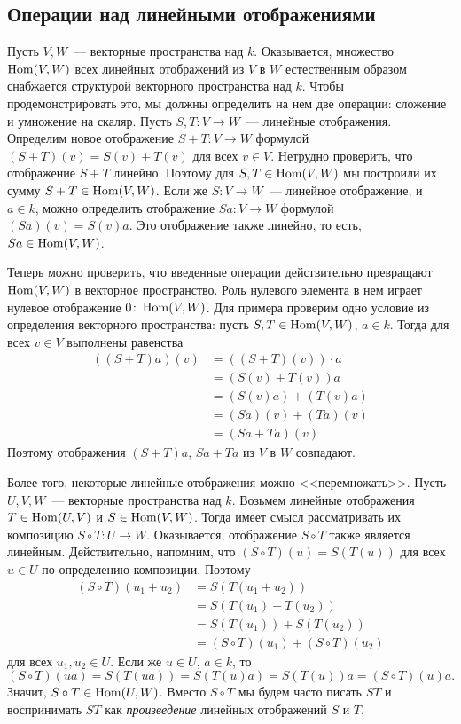 \subsection{Операции над линейными отображениями}\label{subsect:hom_space}



Пусть $V,W$~--- векторные пространства над $k$. Оказывается,
множество $\operatorname{Hom}(V,W)$ всех линейных отображений из $V$ в $W$
естественным образом снабжается структурой векторного
пространства над $k$.
Чтобы продемонстрировать это, мы должны определить на нем
две операции: сложение и умножение на скаляр.
Пусть $S,T\colon V\to W$~--- линейные отображения.
Определим новое отображение $S+T\colon V\to W$
формулой $(S+T)(v) = S(v) + T(v)$ для всех $v\in V$.
Нетрудно проверить, что отображение $S+T$ линейно.
Поэтому для $S,T\in\operatorname{Hom}(V,W)$ мы построили их сумму
$S+T\in\operatorname{Hom}(V,W)$.
Если же $S\colon V\to W$~--- линейное отображение, и $a\in k$,
можно определить отображение $Sa\colon V\to W$ формулой
$(Sa)(v) = S(v)a$. Это отображение также линейно, то есть,
$Sa\in\operatorname{Hom}(V,W)$.

Теперь можно проверить, что введенные операции действительно
превращают $\operatorname{Hom}(V,W)$ в векторное пространство.
Роль нулевого элемента в нем играет нулевое отображение
$0\colon\operatorname{Hom}(V,W)$. Для примера проверим одно условие из
определения векторного пространства:
пусть $S,T\in\operatorname{Hom}(V,W)$, $a\in k$.
Тогда для всех $v\in V$ выполнены равенства
\begin{align*}
((S+T)a)(v) &= ((S+T)(v))\cdot a \\
&= (S(v)+T(v))a \\
&= (S(v)a) + (T(v)a) \\
&= (Sa)(v) + (Ta)(v) \\
&= (Sa+Ta)(v)
\end{align*}
Поэтому отображения $(S+T)a$, $Sa+Ta$ из $V$ в $W$ совпадают.


Более того, некоторые линейные отображения можно <<перемножать>>.
Пусть $U,V,W$~--- векторные пространства над $k$.
Возьмем линейные отображения $T\in\operatorname{Hom}(U,V)$ и
$S\in\operatorname{Hom}(V,W)$. Тогда имеет смысл рассматривать их композицию
$S\circ T\colon U\to W$. Оказывается, отображение $S\circ T$
также является линейным. Действительно, напомним, что
$(S\circ T)(u) = S(T(u))$ для всех $u\in U$ по определению
композиции.
Поэтому
\begin{align*}
(S\circ T)(u_1+u_2) &= S(T(u_1+u_2)) \\
&= S(T(u_1)+T(u_2)) \\
&= S(T(u_1))+S(T(u_2)) \\
&= (S\circ T)(u_1) + (S\circ T)(u_2)
\end{align*}
для всех $u_1,u_2\in U$. Если же $u\in U$, $a\in k$, то
$$
(S\circ T)(ua) = S(T(ua)) = S(T(u)a) = S(T(u))a
= (S\circ T)(u)a.
$$
Значит, $S\circ T\in\operatorname{Hom}(U,W)$.
Вместо $S\circ T$ мы будем часто писать $ST$ и воспринимать
$ST$ как {\em произведение} линейных отображений $S$ и $T$.

